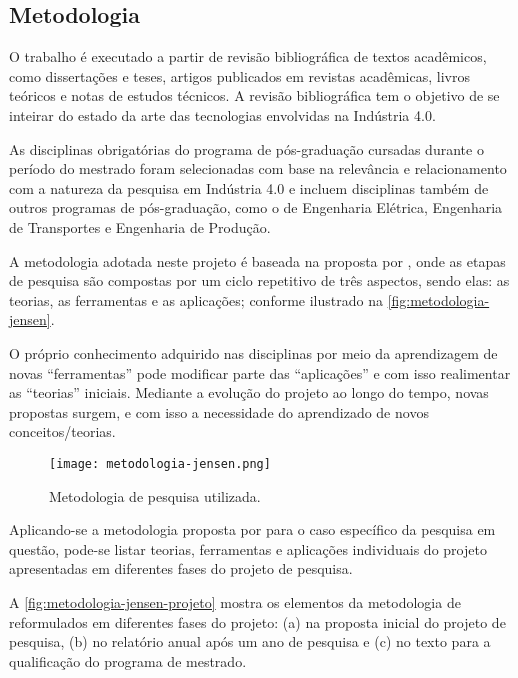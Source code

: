 \begin{apendicesenv}

	\chapter{Metodologia}
	\label{cha:metodologia}

	O trabalho é executado a partir de revisão bibliográfica de textos acadêmicos, como dissertações e teses, artigos publicados em revistas acadêmicas, livros teóricos e notas de estudos técnicos. A revisão bibliográfica tem o objetivo de se inteirar do estado da arte das tecnologias envolvidas na Indústria 4.0.

	As disciplinas obrigatórias do programa de pós-graduação cursadas durante o período do mestrado foram selecionadas com base na relevância e relacionamento com a natureza da pesquisa em Indústria 4.0 e incluem disciplinas também de outros programas de pós-graduação, como o de Engenharia Elétrica, Engenharia de Transportes e Engenharia de Produção.

	A metodologia adotada neste projeto é baseada na proposta por , onde as etapas de pesquisa são compostas por um ciclo repetitivo de três aspectos, sendo elas: as teorias, as ferramentas e as aplicações; conforme ilustrado na \autoref{fig:metodologia-jensen}.

	O próprio conhecimento adquirido nas disciplinas por meio da aprendizagem de novas ``ferramentas'' pode modificar parte das ``aplicações'' e com isso realimentar as ``teorias'' iniciais. Mediante a evolução do projeto ao longo do tempo, novas propostas surgem, e com isso a necessidade do aprendizado de novos conceitos/teorias.

	\begin{figure}[htb]
		\centering
		\texttt{[image: metodologia-jensen.png]}
		\caption{Metodologia de pesquisa utilizada.}
		\label{fig:metodologia-jensen}
	\end{figure}

	Aplicando-se a metodologia proposta por  para o caso específico da pesquisa em questão, pode-se listar teorias, ferramentas e aplicações individuais do projeto apresentadas em diferentes fases do projeto de pesquisa.

	A \autoref{fig:metodologia-jensen-projeto} mostra os elementos da metodologia de  reformulados em diferentes fases do projeto: (a) na proposta inicial do projeto de pesquisa, (b) no relatório anual após um ano de pesquisa e (c) no texto para a qualificação do programa de mestrado.


\end{apendicesenv}

